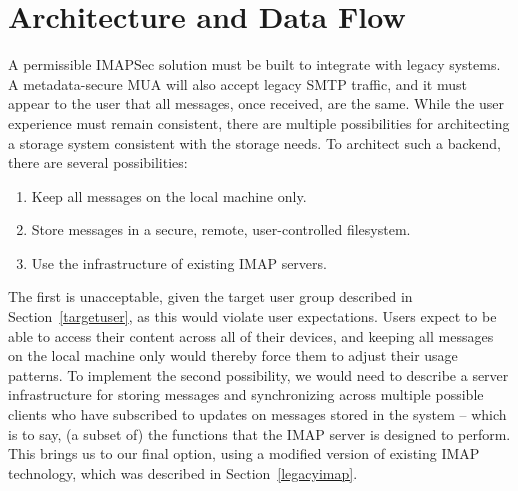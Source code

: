 \documentclass[pageno]{jpaper}
\newcommand{\project}{IMAPSec }
\begin{document}
\section{Architecture and Data Flow}
\label{architecture}


A permissible \project solution must be built to integrate with legacy systems. A metadata-secure MUA will also accept legacy SMTP traffic, and it must appear to the user that all messages, once received, are the same. While the user experience must remain consistent, there are multiple possibilities for architecting a storage system consistent with the storage needs. To architect such a backend, there are several possibilities:

\begin{enumerate}
  \item Keep all messages on the local machine only.
    \item Store messages in a secure, remote, user-controlled filesystem.
    \item Use the infrastructure of existing IMAP servers.
\end{enumerate}

The first is unacceptable, given the target user group described in Section~\ref{targetuser}, as this would violate user expectations. Users expect to be able to access their content across all of their devices, and keeping all messages on the local machine only would thereby force them to adjust their usage patterns. To implement the second possibility, we would need to describe a server infrastructure for storing messages and synchronizing across multiple possible clients who have subscribed to updates on messages stored in the system -- which is to say, (a subset of) the functions that the IMAP server is designed to perform. This brings us to our final option, using a modified version of existing IMAP technology, which was described in Section~\ref{legacyimap}.
\end{document}
